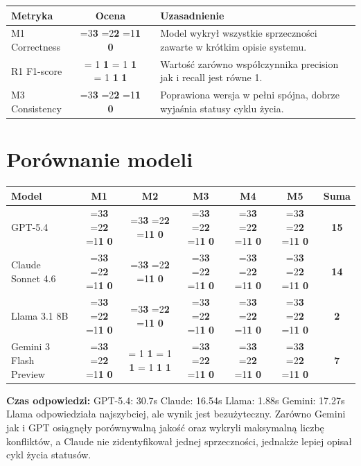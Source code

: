 \documentclass[12pt,a4paper]{article}
\newcommand{\scorebox}[1]{%
  \ifnum#1=3\colorbox{score3}{\textbf{3}}%
  \else\ifnum#1=2\colorbox{score2}{\textbf{2}}%
  \else\ifnum#1=1\colorbox{score1}{\textbf{1}}%
  \else\colorbox{score0}{\textbf{0}}\fi\fi\fi
}
\newcommand{\fonescorebox}[1]{%
    \ifnum\fpeval{#1 >= 0.8} = 1
        \colorbox{score3}{\textbf{#1}}%
    \else
        \ifnum\fpeval{#1 >= 0.6} = 1
            \colorbox{score2}{\textbf{#1}}%
        \else
            \ifnum\fpeval{#1 >= 0.4} = 1
                \colorbox{score1}{\textbf{#1}}%
            \else
                \colorbox{score0}{\textbf{#1}}%
            \fi
        \fi
    \fi
}
\begin{document}
\vspace{0.5em}
\begin{tabular}{lccl}
\toprule
\textbf{Metryka} & \textbf{Ocena} & & \textbf{Uzasadnienie} \\
\midrule
M1 Correctness    & \scorebox{3} && Model wykrył wszystkie sprzeczności zawarte w krótkim opisie systemu. \\
R1 F1-score   & \fonescorebox{1} && Wartość zarówno współczynnika precision jak i recall jest równe 1. \\
M3 Consistency    & \scorebox{3} && Poprawiona wersja w pełni spójna, dobrze wyjaśnia statusy cyklu życia. \\
\bottomrule
\end{tabular}


\section{Porównanie modeli}

\begin{tabular}{lccccc|c}
\toprule
\textbf{Model} & \textbf{M1} & \textbf{M2} & \textbf{M3} & \textbf{M4} & \textbf{M5} & \textbf{Suma} \\
\midrule
GPT-5.4            & \scorebox{3} & \scorebox{3} & \scorebox{3} & \scorebox{3} & \scorebox{3} & \textbf{15} \\
Claude Sonnet 4.6  & \scorebox{3} & \scorebox{2} & \scorebox{3} & \scorebox{3} & \scorebox{3} & \textbf{14} \\
Llama 3.1 8B       & \scorebox{0} & \scorebox{0} & \scorebox{1} & \scorebox{1} & \scorebox{0} & \textbf{2}  \\
Gemini 3 Flash Preview & \scorebox{3} & \fonescorebox{1} & \scorebox{3} & \scorebox{0} & \scorebox{0} & \textbf{7} \\
\bottomrule
\end{tabular}

\vspace{0.5em}
\begin{mdframed}[backgroundcolor=metabg, linewidth=0pt, innerleftmargin=10pt, innerrightmargin=10pt, innertopmargin=6pt, innerbottommargin=6pt]
\small
\textbf{Czas odpowiedzi:} GPT-5.4: 30.7s \quad Claude: 16.54s \quad Llama: 1.88s \quad Gemini: 17.27s\\
Llama odpowiedziała najszybciej, ale wynik jest bezużyteczny. Zarówno Gemini jak i GPT osiągnęły porównywalną jakość oraz wykryli maksymalną liczbę konfliktów, a Claude nie zidentyfikował jednej sprzeczności, jednakże lepiej opisał cykl życia statusów.
\end{mdframed}
\end{document}
